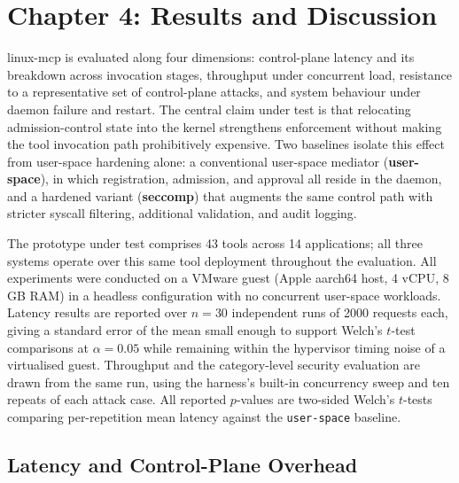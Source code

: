 \section*{Chapter 4: Results and Discussion}
\setcounter{section}{4} \setcounter{subsection}{0}
 \label{chap:evaluation}

\renewcommand{\topfraction}{0.85}
\renewcommand{\bottomfraction}{0.7}
\renewcommand{\textfraction}{0.15}
\renewcommand{\floatpagefraction}{0.9}

linux-mcp is evaluated along four dimensions: control-plane latency and its breakdown across invocation stages, throughput under concurrent load, resistance to a representative set of control-plane attacks, and system behaviour under daemon failure and restart.
The central claim under test is that relocating admission-control state into the kernel strengthens enforcement without making the tool invocation path prohibitively expensive.
Two baselines isolate this effect from user-space hardening alone: a conventional user-space mediator (\textbf{user-space}), in which registration, admission, and approval all reside in the daemon, and a hardened variant (\textbf{seccomp}) that augments the same control path with stricter syscall filtering, additional validation, and audit logging.

The prototype under test comprises 43 tools across 14 applications; all three systems operate over this same tool deployment throughout the evaluation.
All experiments were conducted on a VMware guest (Apple aarch64 host, 4 vCPU, 8 GB RAM) in a headless configuration with no concurrent user-space workloads.
Latency results are reported over $n = 30$ independent runs of 2000 requests each, giving a standard error of the mean small enough to support Welch's $t$-test comparisons at $\alpha = 0.05$ while remaining within the hypervisor timing noise of a virtualised guest.
Throughput and the category-level security evaluation are drawn from the same run, using the harness's built-in concurrency sweep and ten repeats of each attack case.
All reported $p$-values are two-sided Welch's $t$-tests \cite{west2021welch} comparing per-repetition mean latency against the \texttt{user-space} baseline.


\subsection{Latency and Control-Plane Overhead}

